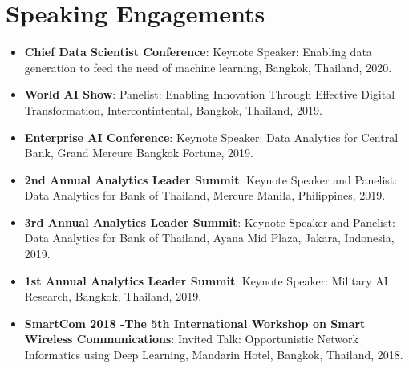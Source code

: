 \documentclass[letterpaper,11pt]{article}
\newcommand{\resumeItem}[2]{
  \item\small{
    \textbf{#1}{: #2 \vspace{-2pt}}
  }
}
\newcommand{\resumeSubItem}[2]{\resumeItem{#1}{#2}\vspace{-4pt}}
\newcommand{\resumeSubHeadingListStart}{\begin{itemize}[leftmargin=*]}
\newcommand{\resumeSubHeadingListEnd}{\end{itemize}}
\begin{document}
\begin{refsection}
	\nocite{Kerdsri2018}
  \nocite{7886152}
  \nocite{7332543}
  \nocite{Kerdsri2012}
  \nocite{6427357}
  \nocite{6174610}
  \nocite{waset2010}
	\AtNextBibliography{\small}
	\printbibliography[title={Conference Proceedings}]
\end{refsection}

\begin{refsection}
  \nocite{book2013}
  \nocite{book2013a}
  \nocite{book2012}
  \nocite{book2012a}
  \nocite{book2012b}
  \nocite{book2007}
  \nocite{kerdsri2003snmp}
	\AtNextBibliography{\small}
	\printbibliography[title={Books}]
\end{refsection}

\section{Speaking Engagements}
  \resumeSubHeadingListStart
  \resumeSubItem{Chief Data Scientist Conference}
    {Keynote Speaker: Enabling data generation to feed the need of machine learning, Bangkok, Thailand, 2020.}
    \resumeSubItem{World AI Show}
      {Panelist: Enabling Innovation Through Effective Digital Transformation, Intercontintental, Bangkok, Thailand, 2019.}
    \resumeSubItem{Enterprise AI Conference}
      {Keynote Speaker: Data Analytics for Central Bank, Grand Mercure Bangkok Fortune, 2019.}
     \resumeSubItem{2nd Annual Analytics Leader Summit}
      {Keynote Speaker and Panelist: Data Analytics for Bank of Thailand, Mercure Manila, Philippines, 2019.}
    \resumeSubItem{3rd Annual Analytics Leader Summit}
      {Keynote Speaker and Panelist: Data Analytics for Bank of Thailand, Ayana Mid Plaza, Jakara, Indonesia, 2019.}
    \resumeSubItem{1st Annual Analytics Leader Summit}
      {Keynote Speaker: Military AI Research, Bangkok, Thailand, 2019.}
    \resumeSubItem{SmartCom 2018 -The 5th International Workshop on Smart Wireless Communications}
      {Invited Talk: Opportunistic Network Informatics using Deep Learning, Mandarin Hotel, Bangkok, Thailand, 2018.}

  \resumeSubHeadingListEnd
\end{document}
